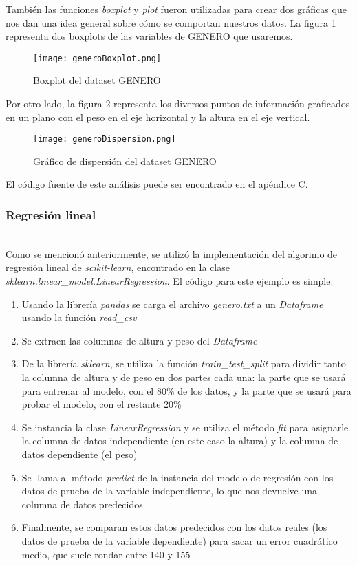 \documentclass[sigconf,authorversion,nonacm]{acmart}
\begin{document}
También las funciones \textit{boxplot} y \textit{plot} fueron utilizadas para crear dos gráficas que nos dan una idea general sobre cómo se comportan nuestros datos.
La figura 1 representa dos boxplots de las variables de GENERO que usaremos.

\begin{figure}[H]
  \centering
  \texttt{[image: generoBoxplot.png]}
  \caption{Boxplot del dataset GENERO}
\end{figure}

Por otro lado, la figura 2 representa los diversos puntos de información graficados en un plano con el peso en el eje horizontal y la altura en el eje vertical.

\begin{figure}[H]
  \centering
  \texttt{[image: generoDispersion.png]}
  \caption{Gráfico de dispersión del dataset GENERO}
\end{figure}

El código fuente de este análisis puede ser encontrado en el apéndice C.

\subsubsection{Regresión lineal}\hfill\\
Como se mencionó anteriormente, se utilizó la implementación del algorimo de regresión lineal de \textit{scikit-learn}, encontrado en la clase \textit{sklearn.linear\_model.LinearRegression}.
El código para este ejemplo es simple:
\begin{enumerate}
  \item Usando la librería \textit{pandas} se carga el archivo \textit{genero.txt} a un \textit{Dataframe} usando la función \textit{read\_csv}
  \item Se extraen las columnas de altura y peso del \textit{Dataframe}
  \item De la librería \textit{sklearn}, se utiliza la función \textit{train\_test\_split} para dividir tanto la columna de altura y de peso en dos partes cada una: la parte que se usará para entrenar al modelo, con el 80\% de los datos, y la parte que se usará para probar el modelo, con el restante 20\%
  \item Se instancia la clase \textit{LinearRegression} y se utiliza el método \textit{fit} para asignarle la columna de datos independiente (en este caso la altura) y la columna de datos dependiente (el peso)
  \item Se llama al método \textit{predict} de la instancia del modelo de regresión con los datos de prueba de la variable independiente, lo que nos devuelve una columna de datos predecidos
  \item Finalmente, se comparan estos datos predecidos con los datos reales (los datos de prueba de la variable dependiente) para sacar un error cuadrático medio, que suele rondar entre 140 y 155
\end{enumerate}
\end{document}
